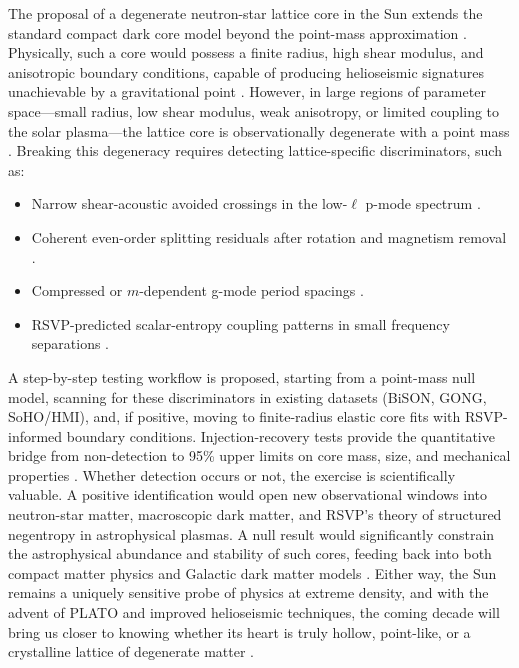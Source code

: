 \documentclass{article}
\begin{document}
The proposal of a degenerate neutron-star lattice core in the Sun extends the standard compact dark core model beyond the point-mass approximation \citep{bellinger2025}. Physically, such a core would possess a finite radius, high shear modulus, and anisotropic boundary conditions, capable of producing helioseismic signatures unachievable by a gravitational point \citep{aerts2010, lund2017}. However, in large regions of parameter space---small radius, low shear modulus, weak anisotropy, or limited coupling to the solar plasma---the lattice core is observationally degenerate with a point mass \citep{kunitomo2022}. Breaking this degeneracy requires detecting lattice-specific discriminators, such as:
\begin{itemize}
\item Narrow shear-acoustic avoided crossings in the low-$\ell$ p-mode spectrum \citep{aerts2010}.
\item Coherent even-order splitting residuals after rotation and magnetism removal \citep{lund2017}.
\item Compressed or $m$-dependent g-mode period spacings \citep{bellinger2025}.
\item RSVP-predicted scalar-entropy coupling patterns in small frequency separations \citep{kunitomo2022}.
\end{itemize}
A step-by-step testing workflow is proposed, starting from a point-mass null model, scanning for these discriminators in existing datasets (BiSON, GONG, SoHO/HMI), and, if positive, moving to finite-radius elastic core fits with RSVP-informed boundary conditions. Injection-recovery tests provide the quantitative bridge from non-detection to 95\% upper limits on core mass, size, and mechanical properties \citep{lund2017}. Whether detection occurs or not, the exercise is scientifically valuable. A positive identification would open new observational windows into neutron-star matter, macroscopic dark matter, and RSVP’s theory of structured negentropy in astrophysical plasmas. A null result would significantly constrain the astrophysical abundance and stability of such cores, feeding back into both compact matter physics and Galactic dark matter models \citep{clemente2025}. Either way, the Sun remains a uniquely sensitive probe of physics at extreme density, and with the advent of PLATO and improved helioseismic techniques, the coming decade will bring us closer to knowing whether its heart is truly hollow, point-like, or a crystalline lattice of degenerate matter \citep{lund2017, clemente2025}.

\newpage

\end{document}
